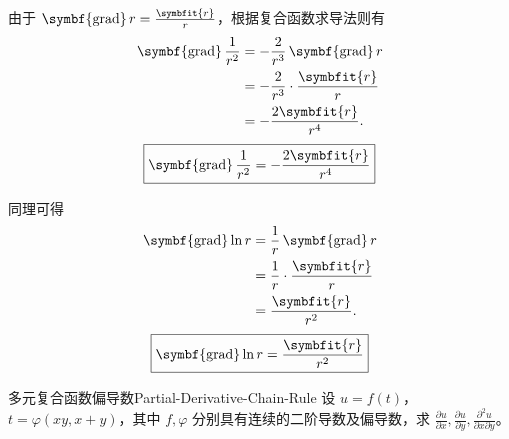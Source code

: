 \begin{solution}

    由于 $\operatorname{\symbf{grad}} r = \frac{\symbfit{r}}{r}$，根据复合函数求导法则有
    \begin{equation}
        \begin{aligned}
            \operatorname{\symbf{grad}} \frac{1}{r^2} & = -\frac{2}{r^3} \operatorname{\symbf{grad}} r \\
                                                      & = -\frac{2}{r^3} \cdot \frac{\symbfit{r}}{r}   \\
                                                      & = -\frac{2 \symbfit{r}}{r^4}.
        \end{aligned}
    \end{equation}
    \begin{equation}
        \boxed{\operatorname{\symbf{grad}} \frac{1}{r^2} = -\frac{2 \symbfit{r}}{r^4}}
    \end{equation}


    同理可得
    \begin{equation}
        \begin{aligned}
            \operatorname{\symbf{grad}} \ln r & = \frac{1}{r} \operatorname{\symbf{grad}} r \\
                                              & = \frac{1}{r} \cdot \frac{\symbfit{r}}{r}   \\
                                              & = \frac{\symbfit{r}}{r^2}.
        \end{aligned}
    \end{equation}
    \begin{equation}
        \boxed{\operatorname{\symbf{grad}} \ln r = \frac{\symbfit{r}}{r^2}}
    \end{equation}
\end{solution}

\begin{problem}{多元复合函数偏导数}{Partial-Derivative-Chain-Rule}
    设 $u = f(t)$，$t = \varphi(xy, x + y)$，其中 $f, \varphi$ 分别具有连续的二阶导数及偏导数，求 $\frac{\partial u}{\partial x}, \frac{\partial u}{\partial y}, \frac{\partial^2 u}{\partial x \partial y}$。
\end{problem}

